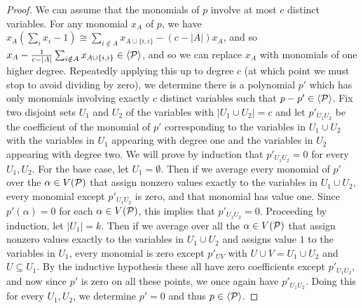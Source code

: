 \begin{proof}
We can assume that the monomials of $p$ involve at most $c$ distinct variables. For any monomial $x_A$ of $p$, we have $x_A(\sum_i x_i - 1) \cong \sum_{i \notin A} x_{A \cup \{i,i\}} - (c-|A|)x_A$, and so $x_A - \frac{1}{c - |A|}\sum_{i \notin A} x_{A \cup \{i,i\}} \in \langle \mathcal P \rangle$, and so we can replace $x_A$ with monomials of one higher degree. Repeatedly applying this up to degree $c$ (at which point we must stop to avoid dividing by zero), we determine there is a polynomial $p'$ which has only monomials involving exactly $c$ distinct variables such that $p - p' \in \langle \mathcal P \rangle$. Fix two disjoint sets $U_1$ and $U_2$ of the variables with $|U_1 \cup U_2| = c$ and let $p'_{U_1U_2}$ be the coefficient of the monomial of $p'$ corresponding to the variables in $U_1 \cup U_2$ with the variables in $U_1$ appearing with degree one and the variables in $U_2$ appearing with degree two. We will prove by induction that $p'_{U_1U_2} = 0$ for every $U_1,U_2$. For the base case, let $U_1 = \emptyset$. Then if we average every monomial of $p'$ over the $\alpha \in V(\mathcal P)$ that assign nonzero values exactly to the variables in $U_1 \cup U_2$, every monomial except $p'_{U_1U_2}$ is zero, and that monomial has value one. Since $p'(\alpha) = 0$ for each $\alpha \in V(\mathcal P)$, this implies that $p'_{U_1U_2} = 0$. Proceeding by induction, let $|U_1| = k$. Then if we average over all the $\alpha \in V(\mathcal P)$ that assign nonzero values exactly to the variables in $U_1 \cup U_2$ and assigns value $1$ to the variables in $U_1$, every monomial is zero except $p'_{UV}$ with $U \cup V = U_1 \cup U_2$ and $U \subseteq U_1$. By the inductive hypothesis these all have zero coefficients except $p'_{U_1U_2}$, and now since $p'$ is zero on all these points, we once again have $p'_{U_1U_2}$. Doing this for every $U_1,U_2$, we determine $p' = 0$ and thus $p \in \langle \mathcal P \rangle$. 
\end{proof}

